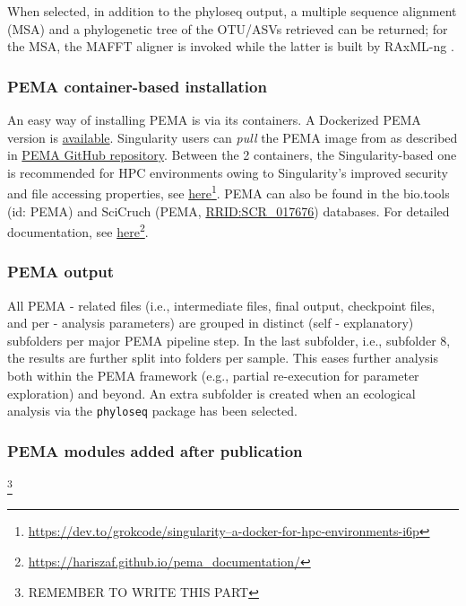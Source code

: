    When selected, in addition to the phyloseq \citep{mcmurdie2013phyloseq} output, a multiple sequence alignment (MSA) and a phylogenetic tree of the OTU/ASVs retrieved can be returned; 
   for the MSA, the MAFFT \citep{katoh2002mafft, nakamura2018parallelization} aligner is invoked while the latter is built by RAxML-ng \citep{kozlov2019raxml}.


   \subsubsection*{PEMA container-based installation}

   An easy way of installing PEMA is via its containers. 
   A Dockerized PEMA version is \href{ https://hub.docker.com/r/hariszaf/pema}{available}. 
   Singularity users can \textit{pull} the PEMA image from as described in \href{https://github.com/hariszaf/pema}{PEMA GitHub repository}. 
   Between the 2 containers, the Singularity-based one is recommended for HPC environments owing to Singularity's improved security and file accessing properties, 
   see \href{https://dev.to/grokcode/singularity--a-docker-for-hpc-environments-i6p}{here}\footnote{\href{https://dev.to/grokcode/singularity--a-docker-for-hpc-environments-i6p}{https://dev.to/grokcode/singularity--a-docker-for-hpc-environments-i6p}}. 
   PEMA can also be found in the bio.tools (id: PEMA) and SciCruch (PEMA, \href{https://scicrunch.org/resolver/RRID:SCR_017676}{RRID:SCR\_017676}) databases. 
   For detailed documentation, see \href{https://hariszaf.github.io/pema_documentation/}{here}\footnote{\href{https://hariszaf.github.io/pema_documentation/}{https://hariszaf.github.io/pema\_documentation/}}.

   \subsubsection*{PEMA output}

   All PEMA - related files (i.e., intermediate files, final output, checkpoint files, and per - analysis parameters) are grouped in distinct (self - explanatory) subfolders per major PEMA pipeline step. 
   In the last subfolder, i.e., subfolder 8, the results are further split into folders per sample. 
   This eases further analysis both within the PEMA framework (e.g., partial re-execution for parameter exploration) and beyond. 
   An extra subfolder is created when an ecological analysis via the \texttt{phyloseq} package has been selected.


   \subsubsection*{PEMA modules added after publication} \footnote{REMEMBER TO WRITE THIS PART}


